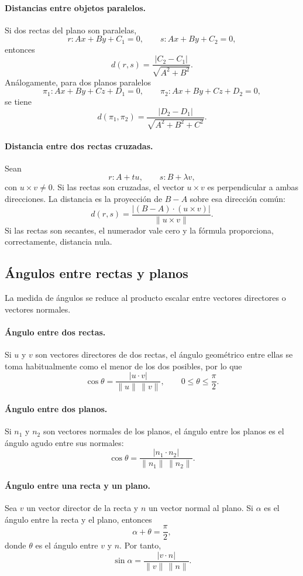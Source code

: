 \paragraph{Distancias entre objetos paralelos.}
Si dos rectas del plano son paralelas,
\[
r:Ax+By+C_1=0,
\qquad
s:Ax+By+C_2=0,
\]
entonces
\[
\boxed{
 d(r,s)=\frac{|C_2-C_1|}{\sqrt{A^2+B^2}}.}
\]
Análogamente, para dos planos paralelos
\[
\pi_1:Ax+By+Cz+D_1=0,
\qquad
\pi_2:Ax+By+Cz+D_2=0,
\]
se tiene
\[
\boxed{
 d(\pi_1,\pi_2)
 =\frac{|D_2-D_1|}{\sqrt{A^2+B^2+C^2}}.}
\]

\paragraph{Distancia entre dos rectas cruzadas.}
Sean
\[
r:A+tu,
\qquad
s:B+\lambda v,
\]
con $u\times v\neq0$. Si las rectas son cruzadas, el vector $u\times v$ es perpendicular a ambas direcciones. La distancia es la proyección de $B-A$ sobre esa dirección común:
\[
\boxed{
 d(r,s)
 =\frac{|(B-A)\cdot(u\times v)|}{\|u\times v\|}.}
\]
Si las rectas son secantes, el numerador vale cero y la fórmula proporciona, correctamente, distancia nula.

\subsection{Ángulos entre rectas y planos}

La medida de ángulos se reduce al producto escalar entre vectores directores o vectores normales.

\paragraph{Ángulo entre dos rectas.}
Si $u$ y $v$ son vectores directores de dos rectas, el ángulo geométrico entre ellas se toma habitualmente como el menor de los dos posibles, por lo que
\[
\boxed{
\cos\theta
=\frac{|u\cdot v|}{\|u\|\,\|v\|},
\qquad
0\leq\theta\leq\frac\pi2.}
\]

\paragraph{Ángulo entre dos planos.}
Si $n_1$ y $n_2$ son vectores normales de los planos, el ángulo entre los planos es el ángulo agudo entre sus normales:
\[
\boxed{
\cos\theta
=\frac{|n_1\cdot n_2|}{\|n_1\|\,\|n_2\|}.}
\]

\paragraph{Ángulo entre una recta y un plano.}
Sea $v$ un vector director de la recta y $n$ un vector normal al plano. Si $\alpha$ es el ángulo entre la recta y el plano, entonces
\[
\alpha+\theta=\frac\pi2,
\]
donde $\theta$ es el ángulo entre $v$ y $n$. Por tanto,
\[
\boxed{
\sin\alpha
=\frac{|v\cdot n|}{\|v\|\,\|n\|}.}
\]

